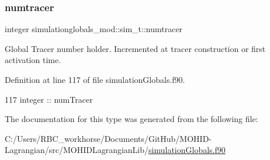 \subsubsection{\texorpdfstring{numtracer}{numtracer}}
{\footnotesize\ttfamily integer simulationglobals\+\_\+mod\+::sim\+\_\+t\+::numtracer\hspace{0.3cm}{\ttfamily [private]}}



Global Tracer number holder. Incremented at tracer construction or first activation time. 



Definition at line 117 of file simulation\+Globals.\+f90.


\begin{DoxyCode}
117         \textcolor{keywordtype}{integer} :: numTracer
\end{DoxyCode}


The documentation for this type was generated from the following file\+:\begin{DoxyCompactItemize}
\item 
C\+:/\+Users/\+R\+B\+C\+\_\+workhorse/\+Documents/\+Git\+Hub/\+M\+O\+H\+I\+D-\/\+Lagrangian/src/\+M\+O\+H\+I\+D\+Lagrangian\+Lib/\mbox{\hyperlink{simulation_globals_8f90}{simulation\+Globals.\+f90}}\end{DoxyCompactItemize}

